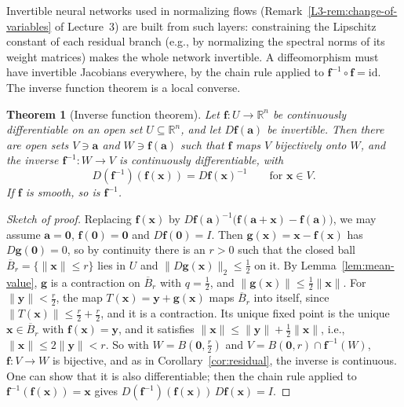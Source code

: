 \documentclass[11pt]{article}
\newcommand{\norm}[1]{\lVert #1 \rVert}
\theoremstyle{definition}
\theoremstyle{plain}
\newtheorem{theorem}[definition]{Theorem}
\theoremstyle{remark}
\begin{document}
Invertible neural networks used in normalizing flows (Remark~\ref{L3-rem:change-of-variables} of Lecture~3) are built from such layers: constraining the Lipschitz constant of each residual branch (e.g., by normalizing the spectral norms of its weight matrices) makes the whole network invertible. A diffeomorphism must have invertible Jacobians everywhere, by the chain rule applied to $\mathbf{f}^{-1} \circ \mathbf{f} = \mathrm{id}$. The inverse function theorem is a local converse.

\begin{theorem}[Inverse function theorem]\label{thm:inverse-function}
    Let $\mathbf{f}: U \to \mathbb{R}^n$ be continuously differentiable on an open set $U \subseteq \mathbb{R}^n$, and let $D\mathbf{f}(\mathbf{a})$ be invertible. Then there are open sets $V \ni \mathbf{a}$ and $W \ni \mathbf{f}(\mathbf{a})$ such that $\mathbf{f}$ maps $V$ bijectively onto $W$, and the inverse $\mathbf{f}^{-1}: W \to V$ is continuously differentiable, with
    \[D(\mathbf{f}^{-1})(\mathbf{f}(\mathbf{x})) = D\mathbf{f}(\mathbf{x})^{-1} \qquad \text{for } \mathbf{x} \in V.\]
    If $\mathbf{f}$ is smooth, so is $\mathbf{f}^{-1}$.
\end{theorem}

\begin{proof}[Sketch of proof]
    Replacing $\mathbf{f}(\mathbf{x})$ by $D\mathbf{f}(\mathbf{a})^{-1}\big(\mathbf{f}(\mathbf{a} + \mathbf{x}) - \mathbf{f}(\mathbf{a})\big)$, we may assume $\mathbf{a} = \mathbf{0}$, $\mathbf{f}(\mathbf{0}) = \mathbf{0}$ and $D\mathbf{f}(\mathbf{0}) = I$. Then $\mathbf{g}(\mathbf{x}) = \mathbf{x} - \mathbf{f}(\mathbf{x})$ has $D\mathbf{g}(\mathbf{0}) = 0$, so by continuity there is an $r > 0$ such that the closed ball $\overline{B}_r = \{\norm{\mathbf{x}} \leq r\}$ lies in $U$ and $\norm{D\mathbf{g}(\mathbf{x})}_2 \leq \frac{1}{2}$ on it. By Lemma~\ref{lem:mean-value}, $\mathbf{g}$ is a contraction on $\overline{B}_r$ with $q = \frac{1}{2}$, and $\norm{\mathbf{g}(\mathbf{x})} \leq \frac{1}{2}\norm{\mathbf{x}}$. For $\norm{\mathbf{y}} < \frac{r}{2}$, the map $T(\mathbf{x}) = \mathbf{y} + \mathbf{g}(\mathbf{x})$ maps $\overline{B}_r$ into itself, since $\norm{T(\mathbf{x})} \leq \frac{r}{2} + \frac{r}{2}$, and it is a contraction. Its unique fixed point is the unique $\mathbf{x} \in \overline{B}_r$ with $\mathbf{f}(\mathbf{x}) = \mathbf{y}$, and it satisfies $\norm{\mathbf{x}} \leq \norm{\mathbf{y}} + \frac{1}{2}\norm{\mathbf{x}}$, i.e., $\norm{\mathbf{x}} \leq 2\norm{\mathbf{y}} < r$. So with $W = B(\mathbf{0}, \frac{r}{2})$ and $V = B(\mathbf{0}, r) \cap \mathbf{f}^{-1}(W)$, $\mathbf{f}: V \to W$ is bijective, and as in Corollary~\ref{cor:residual}, the inverse is continuous. One can show that it is also differentiable; then the chain rule applied to $\mathbf{f}^{-1}(\mathbf{f}(\mathbf{x})) = \mathbf{x}$ gives $D(\mathbf{f}^{-1})(\mathbf{f}(\mathbf{x}))\,D\mathbf{f}(\mathbf{x}) = I$.
\end{proof}
\end{document}
